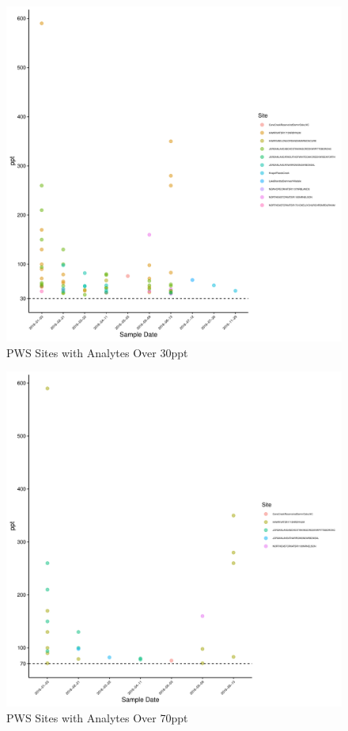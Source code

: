\documentclass[
  12pt,
]{article}
\begin{document}
\begin{figure}

\includegraphics{PFAS_FinalProject_files/figure-latex/unnamed-chunk-18-1} \hfill{}

\caption{PWS Sites with Analytes Over 30ppt}\label{fig:unnamed-chunk-18}
\end{figure}

\begin{figure}

\includegraphics{PFAS_FinalProject_files/figure-latex/unnamed-chunk-19-1} \hfill{}

\caption{PWS Sites with Analytes Over 70ppt}\label{fig:unnamed-chunk-19}
\end{figure}
\end{document}
